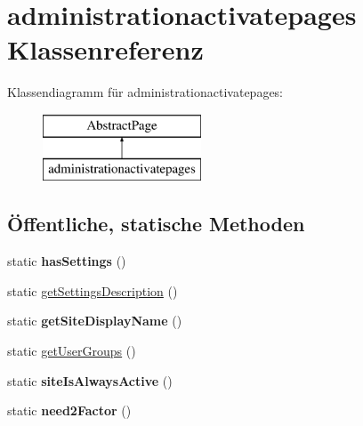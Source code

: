 \hypertarget{classadministrationactivatepages}{}\section{administrationactivatepages Klassenreferenz}
\label{classadministrationactivatepages}
Klassendiagramm für administrationactivatepages\+:\begin{figure}[H]
\begin{center}
\leavevmode
\includegraphics[height=2.000000cm]{classadministrationactivatepages}
\end{center}
\end{figure}
\subsection*{Öffentliche, statische Methoden}
\begin{DoxyCompactItemize}
\item 
\mbox{\label{classadministrationactivatepages_a386a97a76067f08ebd2d6bc913d93ebc}} 
static {\bfseries has\+Settings} ()
\item 
static \mbox{\hyperlink{classadministrationactivatepages_a8b1a7b5da0e76699cd9a409ca3daf1f4}{get\+Settings\+Description}} ()
\item 
\mbox{\label{classadministrationactivatepages_aa429420546de7c8905a40e835d7f8b78}} 
static {\bfseries get\+Site\+Display\+Name} ()
\item 
static \mbox{\hyperlink{classadministrationactivatepages_a8763c2175e7e3dcc7b97cedc709dea53}{get\+User\+Groups}} ()
\item 
\mbox{\label{classadministrationactivatepages_acc674745cca2e8c49ea5164bc1b2e311}} 
static {\bfseries site\+Is\+Always\+Active} ()
\item 
\mbox{\label{classadministrationactivatepages_a35a28c89d75dde7a93b0d1805ccf8cc3}} 
static {\bfseries need2\+Factor} ()
\end{DoxyCompactItemize}
